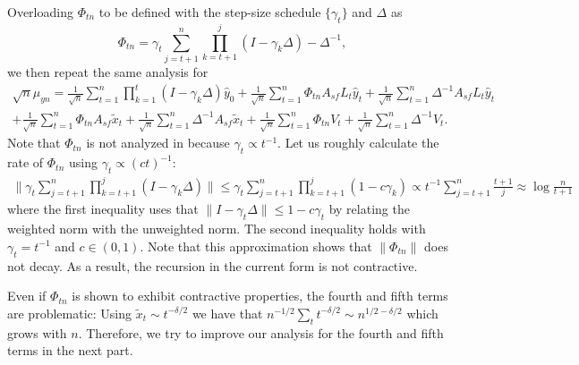 Overloading $\Phi_{tn}$ to be defined with the step-size schedule $\{\gamma_t\}$ and $\Delta$ as
\begin{equation}
    \Phi_{tn} = \gamma_t \sum_{j=t+1}^n \prod_{k=t+1}^j (I - \gamma_k \Delta) - \Delta^{-1},
\end{equation}
we then repeat the same analysis for 
\begin{align*}
    \sqrt{n} \hat{\mu}_{yn} = \frac{1}{\sqrt{n}} \sum_{t=1}^n \prod_{k=1}^t (I - \gamma_k \Delta) \hat{y}_0 + \frac{1}{\sqrt{n}} \sum_{t=1}^n \Phi_{tn} A_{sf} L_t \hat{y}_t + \frac{1}{\sqrt{n}} \sum_{t=1}^n \Delta^{-1} A_{sf} L_t \hat{y}_t 
    \\
    + \frac{1}{\sqrt{n}} \sum_{t=1}^n \Phi_{tn} A_{sf} \tilde{x}_t + \frac{1}{\sqrt{n}} \sum_{t=1}^n \Delta^{-1} A_{sf} \tilde{x}_t + 
    \frac{1}{\sqrt{n}} \sum_{t=1}^n \Phi_{tn} V_t + \frac{1}{\sqrt{n}} \sum_{t=1}^n \Delta^{-1} V_t .
\end{align*}
Note that $\Phi_{tn}$ is not analyzed in \citep{srikant2024CLT,polyakJuditsky} because $\gamma_t \propto t^{-1}$.
Let us roughly calculate the rate of $\Phi_{tn}$ using $\gamma_t \propto (c t)^{-1}$:
\begin{align*}
    \lVert \gamma_t \sum_{j=t+1}^n \prod_{k=t+1}^j (I - \gamma_k \Delta) \rVert \leq \gamma_t \sum_{j=t+1}^n \prod_{k=t+1}^j (1 - c \gamma_k) 
    \propto t^{-1} \sum_{j=t+1}^n \frac{t+1}{j}
    \approx \log \frac{n}{t+1}
\end{align*}
where the first inequality uses that $\lVert I - \gamma_t \Delta \rVert \leq 1 - c \gamma_t$ by relating the weighted norm with the unweighted norm.
The second inequality holds with $\gamma_t = t^{-1}$ and $c \in (0, 1)$.
Note that this approximation shows that $\lVert \Phi_{tn}\rVert$ does not decay. 
As a result, the recursion in the current form is not contractive.


Even if $\Phi_{tn}$ is shown to exhibit contractive properties, the fourth and fifth terms are problematic: Using $\tilde{x}_t \sim t^{-\delta/2}$ we have that $n^{-1/2} \sum_t t^{-\delta / 2} \sim n^{1/2 - \delta/2}$ which grows with $n$.
Therefore, we try to improve our analysis for the fourth and fifth terms in the next part.


